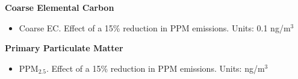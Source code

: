 \textbf{Coarse Elemental Carbon}
\begin{itemize}
\item Coarse EC. Effect of a 15\% reduction in PPM emissions. Units:
  0.1 ng/m$^3$
\end{itemize}
\vspace{20pt}

\textbf{Primary Particulate Matter}
\begin{itemize}
\item PPM$_{2.5}$. Effect of a 15\% reduction in PPM emissions. Units: ng/m$^3$
\end{itemize}
\vspace{20pt}
  



\cleartoleftpage

\newlength{\previousparindent}
\setlength{\previousparindent}{\parindent}
\setlength{\parindent}{0pt}
\newlength{\previousheadsep}
\setlength{\previousheadsep}{\headsep}

\newlength{\myheadsep}
\setlength{\myheadsep}{0.5\headsep}
\setlength{\headsep}{\myheadsep}

\newlength{\mywidth}
\newlength{\myheight}
\newlength{\myenlarge}

\setlength{\mywidth}{1.1\textwidth}
\setlength{\myheight}{1.00\textheight}
\setlength{\myenlarge}{8\baselineskip}



